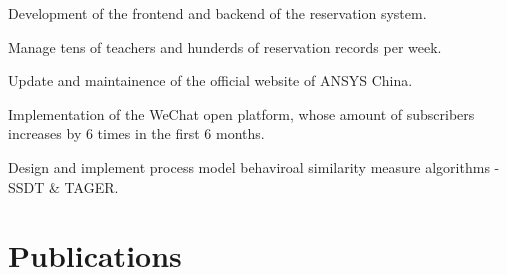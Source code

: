 \documentclass[]{resume_en}
\begin{document}
\begin{minipage}[t]{0.66\textwidth}
\begin{tightemize}
\item Development of the frontend and backend of the reservation system.
\item Manage tens of teachers and hunderds of reservation records per week.
\end{tightemize}
\shortsectionsep

\begin{tightemize}
\item Update and maintainence of the official website of ANSYS China.
\item Implementation of the WeChat open platform, whose amount of subscribers increases by 6 times in the first 6 months.
\end{tightemize}
\shortsectionsep

\begin{tightemize}
\item Design and implement process model behaviroal similarity measure algorithms - SSDT \& TAGER.
\end{tightemize}



\section{Publications} 
\renewcommand\refname{\vskip -1.6cm} %


\nocite{*}

\end{minipage} 
\end{document}
